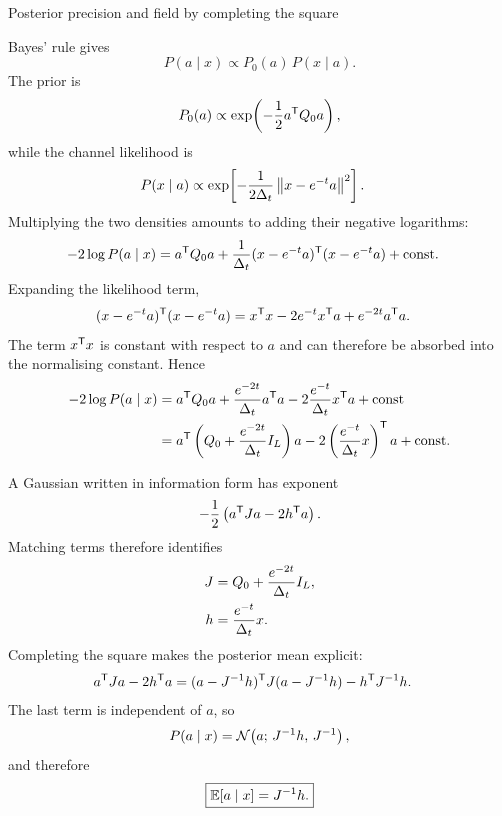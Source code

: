 \begin{toolbox}{Posterior precision and field by completing the square}

Bayes' rule gives
\begin{equation}
  P(a\mid x)
  \propto
  P_0(a)\,P(x\mid a).
\end{equation}
The prior is
\begin{equation}
  P_0(a)
  \propto
  \exp\!\left(
    -\frac12 a^{\mathsf{T}}Q_0 a
  \right),
\end{equation}
while the channel likelihood is
\begin{align}
  P(x\mid a)
  &\propto
  \exp\!\left[
    -\frac{1}{2\Delta_t}
    \left\lVert x-e^{-t}a \right\rVert^2
  \right].
\end{align}
Multiplying the two densities amounts to adding their negative
logarithms:
\begin{align}
  -2\log P(a\mid x)
  &=
  a^{\mathsf{T}}Q_0 a
  +
  \frac{1}{\Delta_t}
  (x-e^{-t}a)^{\mathsf{T}}(x-e^{-t}a)
  +\mathrm{const}.
  \label{eq:g-post-expand-1}
\end{align}
Expanding the likelihood term,
\begin{align}
  (x-e^{-t}a)^{\mathsf{T}}(x-e^{-t}a)
  &=
  x^{\mathsf{T}}x
  -2e^{-t}x^{\mathsf{T}}a
  +e^{-2t}a^{\mathsf{T}}a.
\end{align}
The term $x^{\mathsf{T}}x$ is constant with respect to $a$ and can therefore be
absorbed into the normalising constant. Hence
\begin{align}
  -2\log P(a\mid x)
  &=
  a^{\mathsf{T}}Q_0 a
  +
  \frac{e^{-2t}}{\Delta_t}a^{\mathsf{T}}a
  -
  2\frac{e^{-t}}{\Delta_t}x^{\mathsf{T}}a
  +\mathrm{const}
  \\
  &=
  a^{\mathsf{T}}
  \left(
    Q_0+\frac{e^{-2t}}{\Delta_t}I_L
  \right)a
  -
  2
  \left(
    \frac{e^{-t}}{\Delta_t}x
  \right)^{\mathsf{T}}a
  +\mathrm{const}.
  \label{eq:g-post-expand-2}
\end{align}

A Gaussian written in information form has exponent
\begin{equation}
  -\frac12
  \left(
    a^{\mathsf{T}}Ja-2h^{\mathsf{T}}a
  \right).
\end{equation}
Matching terms therefore identifies
\begin{align}
  J
  &=
  Q_0+\frac{e^{-2t}}{\Delta_t}I_L,
  \label{eq:g-J-identified}\\
  h
  &=
  \frac{e^{-t}}{\Delta_t}x.
  \label{eq:g-h-identified}
\end{align}
Completing the square makes the posterior mean explicit:
\begin{align}
  a^{\mathsf{T}}Ja-2h^{\mathsf{T}}a
  &=
  (a-J^{-1}h)^{\mathsf{T}}
  J
  (a-J^{-1}h)
  -
  h^{\mathsf{T}}J^{-1}h.
\end{align}
The last term is independent of $a$, so
\begin{equation}
  P(a\mid x)
  =
  \mathcal{N}\!\left(
    a;\,
    J^{-1}h,\,
    J^{-1}
  \right),
\end{equation}
and therefore
\begin{equation}
  \boxed{
  \mathbb{E}[a\mid x]=J^{-1}h.
  }
\end{equation}


\end{toolbox}
